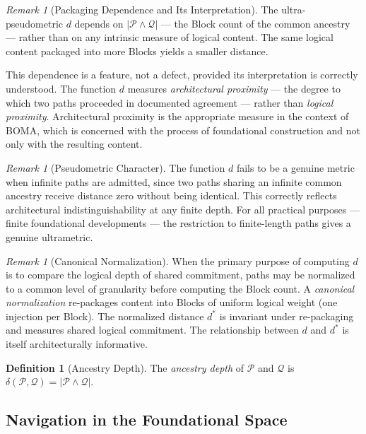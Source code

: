 \documentclass[12pt, a4paper]{article}
\theoremstyle{plain}
\theoremstyle{definition}
\newtheorem{definition}[theorem]{Definition}
\theoremstyle{remark}
\newtheorem{remark}[theorem]{Remark}
\newcommand{\CA}[2]{#1 \wedge #2}
\newcommand{\BOMA}{\textsf{BOMA}}
\begin{document}
\begin{remark}[Packaging Dependence and Its Interpretation]
\label{rem:packaging}
The ultra-pseudometric $d$ depends on $|\CA{\mathcal{P}}{\mathcal{Q}}|$
--- the Block count of the common ancestry --- rather than on any
intrinsic measure of logical content. The same logical content
packaged into more Blocks yields a smaller distance.

This dependence is a feature, not a defect, provided its
interpretation is correctly understood. The function $d$ measures
\emph{architectural proximity} --- the degree to which two paths
proceeded in documented agreement --- rather than \emph{logical
proximity}. Architectural proximity is the appropriate measure in the
context of \BOMA{}, which is concerned with the process of foundational
construction and not only with the resulting content.
\end{remark}

\begin{remark}[Pseudometric Character]
\label{rem:pseudometric}
The function $d$ fails to be a genuine metric when infinite paths are
admitted, since two paths sharing an infinite common ancestry receive
distance zero without being identical. This correctly reflects
architectural indistinguishability at any finite depth. For all
practical purposes --- finite foundational developments --- the
restriction to finite-length paths gives a genuine ultrametric.
\end{remark}

\begin{remark}[Canonical Normalization]
\label{rem:normalization}
When the primary purpose of computing $d$ is to compare the logical
depth of shared commitment, paths may be normalized to a common level
of granularity before computing the Block count. A \emph{canonical
normalization} re-packages content into Blocks of uniform logical
weight (one injection per Block). The normalized distance $d^*$ is
invariant under re-packaging and measures shared logical commitment.
The relationship between $d$ and $d^*$ is itself architecturally
informative.
\end{remark}

\begin{definition}[Ancestry Depth]
\label{def:ancestry-depth}
The \emph{ancestry depth} of $\mathcal{P}$ and $\mathcal{Q}$ is
$\delta(\mathcal{P},\mathcal{Q}) = |\CA{\mathcal{P}}{\mathcal{Q}}|$.
\end{definition}

\subsection{Navigation in the Foundational Space}
\label{subsec:navigation}
\end{document}
